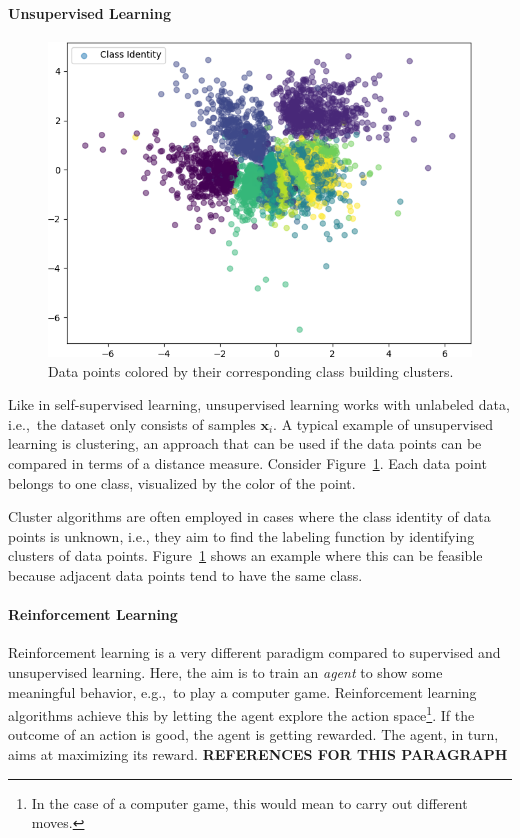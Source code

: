 \paragraph{Unsupervised Learning}
\begin{figure}
    \centering
    \includegraphics[width=.48\textwidth]{images/latent_spaces/mnist/vae/embeddings_mu_6.png}
    \caption[Clusters of data points]{Data points colored by their corresponding class building clusters.}
    \label{fig:clustering_example}
\end{figure}
Like in self-supervised learning, unsupervised learning works with unlabeled data, i.e.,~the dataset only consists of samples $\bm{x}_i$.
A typical example of unsupervised learning is clustering, an approach that can be used if the data points can be compared in terms of a distance measure.
Consider Figure~\ref{fig:clustering_example}.
Each data point belongs to one class, visualized by the color of the point.

Cluster algorithms are often employed in cases where the class identity of data points is unknown, i.e., they aim to find the labeling function by identifying clusters of data points.
Figure~\ref{fig:clustering_example} shows an example where this can be feasible because adjacent data points tend to have the same class.

\paragraph{Reinforcement Learning}
Reinforcement learning is a very different paradigm compared to supervised and unsupervised learning.
Here, the aim is to train an \textit{agent} to show some meaningful behavior, e.g.,~to play a computer game.
Reinforcement learning algorithms achieve this by letting the agent explore the action space\footnote{In the case of a computer game, this would mean to carry out different moves.}.
If the outcome of an action is good, the agent is getting rewarded.
The agent, in turn, aims at maximizing its reward. \textbf{REFERENCES FOR THIS PARAGRAPH}

